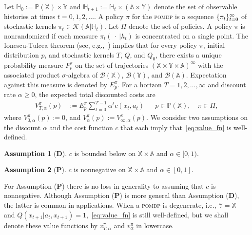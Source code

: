 \documentclass[11pt,onecolumn]{IEEEtran}  %
\newcommand{\Ab}{\mathbb{A}}
\newcommand{\Hb}{\mathbb{H}}
\newcommand{\Pb}{\mathbb{P}}
\newcommand{\Xb}{\mathbb{X}}
\newcommand{\Yb}{\mathbb{Y}}
\newcommand{\Bc}{\mathcal{B}}
\newcommand{\Kc}{\mathcal{K}}
\newcommand{\defeq}{:=}%
\newcommand{\pomdp}{\textsc{pomdp}}
\DeclarePairedDelimiter{\set}{\{}{\}}
\theoremstyle{definition}
\newtheorem*{assumption*}{Assumption}
\begin{document}
Let $\Hb_0 \defeq \Pb(\Xb) \times \Yb$ and $\Hb_{t+1} \defeq \Hb_t \times (\Ab \times \Yb)$ denote the set of observable histories at times $t=0,1,2,\dots$. A policy $\pi$ for the \pomdp{} is a sequence $\set{\pi_t}_{t=0}^{\infty}$ of stochastic kernels $\pi_t \in \Kc(\Ab| \Hb_t)$. Let $\Pi$ denote the set of policies. A policy $\pi$ is nonrandomized if each measure $\pi_t(\:\cdot\:|h_t)$ is concentrated on a single point. The Ionescu-Tulcea theorem (see, e.g.,~\citet[Proposition 7.28]{bertsekas_stochastic_1996}) implies that for every policy $\pi$, initial distribution $p$, and stochastic kernels $T$, $Q$, and $Q_0$, there exists a unique probability measure $P_{p}^\pi$ on the set of trajectories $(\Xb \times \Yb \times \Ab)^{\infty}$ with the associated product $\sigma$-algebra of $\Bc(\Xb)$, $\Bc(\Yb)$, and $\Bc(\Ab)$. Expectation against this measure is denoted by $E_{p}^{\pi}$. For a horizon $T=1,2,\dots, \infty$ and discount rate $\alpha \geq 0$, the expected total discounted costs are
\begin{align} \label{eq:value_fn}
    V_{T,\alpha}^{\pi}(p) &\defeq E_p^\pi \sum_{t=0}^{T-1} \alpha^t c(x_t, a_t) &&
    p \in \Pb(\Xb), \quad \pi \in \Pi,
\end{align}
where $V_{0,\alpha}^{\pi}(p) \defeq 0$, and $V_{\alpha}^{\pi}(p) \defeq V_{\infty,\alpha}^{\pi}(p)$. We consider two assumptions on the discount $\alpha$ and the cost function $c$ that each imply that~\eqref{eq:value_fn} is well-defined.
\begin{assumption*}[\textbf{D}]
    $c$ is bounded below on $\Xb \times \Ab$ and $\alpha \in [0,1)$.
\end{assumption*}
\begin{assumption*}[\textbf{P}]
    $c$ is nonnegative on $\Xb \times \Ab$ and $\alpha \in [0,1]$.
\end{assumption*}
For Assumption (\textbf{P}) there is no loss in generality to assuming that $c$ is nonnegative. Although Assumption (\textbf{P}) is more general than Assumption (\textbf{D}), the latter is common in applications. When a \pomdp{} is degenerate, i.e., $\Yb = \Xb$ and $Q(x_{t+1}|a_t, x_{t+1}) = 1$,~\eqref{eq:value_fn} is still well-defined, but we shall denote these value functions by $v_{T,\alpha}^{\pi}$ and $v_{\alpha}^{\pi}$ in lowercase.
\end{document}

